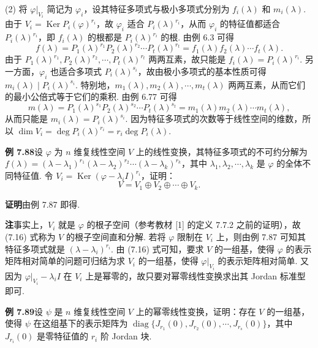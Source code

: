 \documentclass[UTF8, 12pt, fontset=fandol, oneside]{ctexart}
\begin{document}
(2) 将 $\varphi|_{V_i}$ 简记为 $\varphi_i$，设其特征多项式与极小多项式分别为 $f_i(\lambda)$ 和 $m_i(\lambda)$. 由于 $V_i=\operatorname{Ker}P_i(\varphi)^{r_i}$，故 $\varphi_i$ 适合 $P_i(\lambda)^{r_i}$，从而 $\varphi_i$ 的特征值都适合 $P_i(\lambda)^{r_i}$，即 $f_i(\lambda)$ 的根都是 $P_i(\lambda)^{r_i}$ 的根. 由例 6.3 可得
\[
f(\lambda)=P_1(\lambda)^{r_1}P_2(\lambda)^{r_2}\cdots P_t(\lambda)^{r_t}=f_1(\lambda)f_2(\lambda)\cdots f_t(\lambda).
\]
由于 $P_1(\lambda)^{r_1},P_2(\lambda)^{r_2},\cdots,P_t(\lambda)^{r_t}$ 两两互素，故只能是 $f_i(\lambda)=P_i(\lambda)^{r_i}$. 另一方面，$\varphi_i$ 也适合多项式 $P_i(\lambda)^{s_i}$，故由极小多项式的基本性质可得 $m_i(\lambda)\mid P_i(\lambda)^{s_i}$. 特别地，$m_1(\lambda),m_2(\lambda),\cdots,m_t(\lambda)$ 两两互素，从而它们的最小公倍式等于它们的乘积. 由例 6.77 可得
\[
m(\lambda)=P_1(\lambda)^{s_1}P_2(\lambda)^{s_2}\cdots P_t(\lambda)^{s_t}=m_1(\lambda)m_2(\lambda)\cdots m_t(\lambda),
\]
从而只能是 $m_i(\lambda)=P_i(\lambda)^{s_i}$. 因为特征多项式的次数等于线性空间的维数，所以 $\dim V_i=\deg P_i(\lambda)^{r_i}=r_i\deg P_i(\lambda)$.

\noindent\textbf{例 7.88}\quad 设 $\varphi$ 为 $n$ 维复线性空间 $V$ 上的线性变换，其特征多项式的不可约分解为 $f(\lambda)=(\lambda-\lambda_1)^{r_1}(\lambda-\lambda_2)^{r_2}\cdots(\lambda-\lambda_k)^{r_k}$，其中 $\lambda_1,\lambda_2,\cdots,\lambda_k$ 是 $\varphi$ 的全体不同特征值. 令 $V_i=\operatorname{Ker}(\varphi-\lambda_iI)^{r_i}$，证明：
\[
V=V_1\oplus V_2\oplus\cdots\oplus V_k.
\tag{7.16}
\]

\noindent\textbf{证明}\quad 由例 7.87 即得.

\noindent\textbf{注}\quad 事实上，$V_i$ 就是 $\varphi$ 的根子空间（参考教材 [1] 的定义 7.7.2 之前的证明），故 (7.16) 式称为 $V$ 的根子空间直和分解. 若将 $\varphi$ 限制在 $V_i$ 上，则由例 7.87 可知其特征多项式就是 $(\lambda-\lambda_i)^{r_i}$. 由 (7.16) 式可知，要求 $V$ 的一组基，使得 $\varphi$ 的表示矩阵相对简单的问题可归结为求 $V_i$ 的一组基，使得 $\varphi|_{V_i}$ 的表示矩阵相对简单. 又因为 $\varphi|_{V_i}-\lambda_iI$ 在 $V_i$ 上是幂零的，故只要对幂零线性变换求出其 Jordan 标准型即可.

\noindent\textbf{例 7.89}\quad 设 $\psi$ 是 $n$ 维复线性空间 $V$ 上的幂零线性变换，证明：存在 $V$ 的一组基，使得 $\psi$ 在这组基下的表示矩阵为 $\operatorname{diag}\{J_{r_1}(0),J_{r_2}(0),\cdots,J_{r_s}(0)\}$，其中 $J_{r_i}(0)$ 是零特征值的 $r_i$ 阶 Jordan 块.
\end{document}
